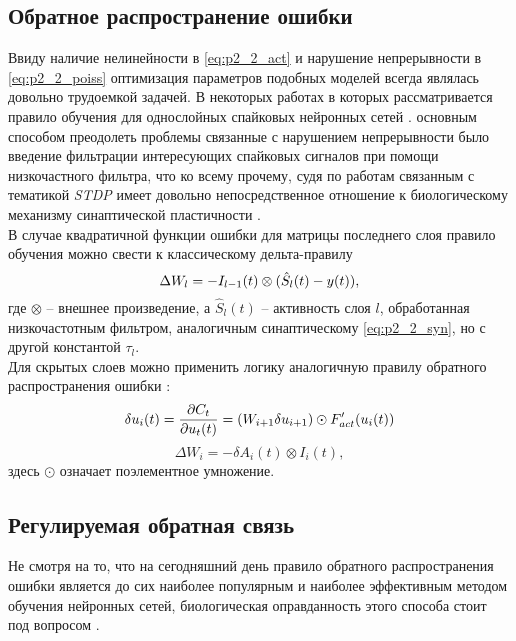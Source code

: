 \subsection{Обратное распространение ошибки}
\indent Ввиду наличие нелинейности в \eqref{eq:p2_2_act} и нарушение непрерывности в \eqref{eq:p2_2_poiss} оптимизация параметров подобных моделей всегда являлась довольно трудоемкой задачей. В некоторых работах в которых рассматривается правило обучения для однослойных спайковых нейронных сетей \cite{mohemmed2012span, florian2008tempotron, ponulak2005resume}. основным способом преодолеть проблемы связанные с нарушением непрерывности было введение фильтрации интересующих спайковых сигналов при помощи низкочастного фильтра, что ко всему прочему, судя по работам связанным с тематикой  \textit{STDP} имеет довольно непосредственное отношение к биологическому механизму синаптической пластичности \cite{dan2004spike}.\\
\indent В случае квадратичной функции ошибки для матрицы последнего слоя правило обучения можно свести к классическому дельта-правилу \cite{jain1998fusion}
\begin{equation}
\Delta W_{l} = - \space I_{l-1}(t) \otimes (\hat S_{l}(t) - y(t)),
\end{equation}
где $\otimes$ -- внешнее произведение, а $\hat S_{l}(t)$ -- активность слоя $l$, обработанная низкочастотным фильтром, аналогичным синаптическому \eqref{eq:p2_2_syn}, но с другой константой $\tau_{l}$.\\
\indent Для скрытых слоев можно применить логику аналогичную правилу обратного распространения ошибки \cite{wossermanNeuroComp}:
\begin{equation}
\delta u_{i}(t) = \frac{\partial C_{t}}{\partial u_{t}(t)} = (W_{i+1} \delta u_{i+1}) \odot F_{act}'(u_{i}(t))\\
\end{equation}
\begin{equation}
\Delta W_{i} = - \delta A_{i}(t) \otimes I_{i}(t),
\end{equation}
здесь $\odot$ означает поэлементное умножение.
\subsection{Регулируемая обратная связь}
\indent Не смотря на то, что на сегодняшний день правило обратного распространения ошибки является до сих наиболее популярным и наиболее эффективным методом обучения нейронных сетей, биологическая оправданность этого способа стоит под вопросом \cite{rumelhart1986david, grossberg1987competitive, crick1989recent}.
